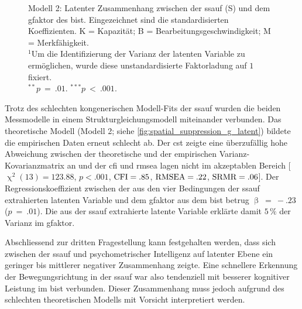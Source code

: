\documentclass[11pt, twoside, a4paper]{book}		%
\begin{document}
\begin{figure}[htbp]
	
	\vspace{.2cm}
	\caption[CFA Platzhalter Test]{Modell 2: Latenter Zusammenhang zwischen der \gls{ssauf} (\textsf{S}) und dem \gls{gfaktor} des \gls{bist}. Eingezeichnet sind die standardisierten Koeffizienten. \textsf{K} = Kapazität; \textsf{B} = Bearbeitungsgeschwindigkeit; \textsf{M} = Merkfähigkeit.\\
	$^1$Um die Identifizierung der Varianz der latenten Variable zu ermöglichen, wurde diese unstandardisierte Faktorladung auf $1$ fixiert.\\
	$^{**}p~=~.01$. $^{***}p~<~.001$.}
	\label{fig:spatial_suppression_g_latent}
\end{figure} 

Trotz des schlechten kongenerischen Modell-Fits der \gls{ssauf} wurden die beiden Messmodelle in einem Strukturgleichungsmodell miteinander verbunden. Das theoretische Modell (Modell 2; siehe \autoref{fig:spatial_suppression_g_latent}) bildete die empirischen Daten erneut schlecht ab.  Der \gls{cst} zeigte eine überzufällig hohe Abweichung zwischen der theoretische und der empirischen Var\-ianz-Ko\-var\-ianz\-ma\-trix an und der \gls{cfi} und \gls{rmsea} lagen nicht im akzeptablen Bereich [$\upchi^2(13)=123.88$, $p<.001$, $\textnormal{CFI}=.85$, $\textnormal{RMSEA}=.22$, $\textnormal{SRMR}=.06$]. 
Der Regressionskoeffizient zwischen der aus den vier Bedingungen der \gls{ssauf} extrahierten latenten Variable und dem \gls{gfaktor} aus dem \gls{bist} betrug $\upbeta~=~-.23$ ($p~=~.01$).
Die aus der \gls{ssauf} extrahierte latente Variable erklärte damit $5\,\%$ der Varianz im \gls{gfaktor}.

Abschliessend zur dritten Fragestellung kann festgehalten werden, dass 
sich zwischen der \gls{ssauf} und psychometrischer Intelligenz auf latenter Ebene ein geringer bis mittlerer negativer Zusammenhang zeigte. Eine schnellere Erkennung der Bewegungsrichtung in der \gls{ssauf} war also tendenziell mit besserer kognitiver Leistung im \gls{bist} verbunden. Dieser Zusammenhang muss jedoch aufgrund des schlechten theoretischen Modells  mit Vorsicht interpretiert werden.
\end{document}
